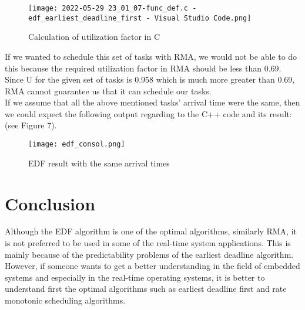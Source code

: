 \documentclass[conference]{IEEEtran}
\begin{document}
\begin{figure}[h]
    \centering
    \texttt{[image: 2022-05-29 23\_01\_07-func\_def.c - edf\_earliest\_deadline\_first - Visual Studio Code.png]}
    \caption{Calculation of utilization factor in C\cite{git}}
    \label{fig:ex2}
\end{figure}

If we wanted to schedule this set of tasks with RMA, we would not be able to do this because the required utilization factor in RMA should be less than 0.69. Since U for the given set of tasks is 0.958 which is much more greater than 0.69, RMA cannot guarantee us that it can schedule our tasks. \\ 

If we assume that all the above mentioned tasks' arrival time were the same, then we could expect the following output regarding to the C++ code and its result: (see Figure 7).\\

\begin{figure}[h]
    \centering
    \texttt{[image: edf\_consol.png]}
    \caption{EDF result with the same arrival times\cite{git1}}
    \label{fig:ex2}
\end{figure}

\section{Conclusion}
Although the EDF algorithm is one of the optimal algorithms, similarly RMA, it is not preferred to be used in some of the real-time system applications. This is mainly because of the predictability problems of the earliest deadline algorithm. However, if someone wants to get a better understanding in the field of embedded systems and especially in the real-time operating systems, it is better to understand first the optimal algorithms such as earliest deadline first and rate monotonic scheduling algorithms. \\








\end{document}
